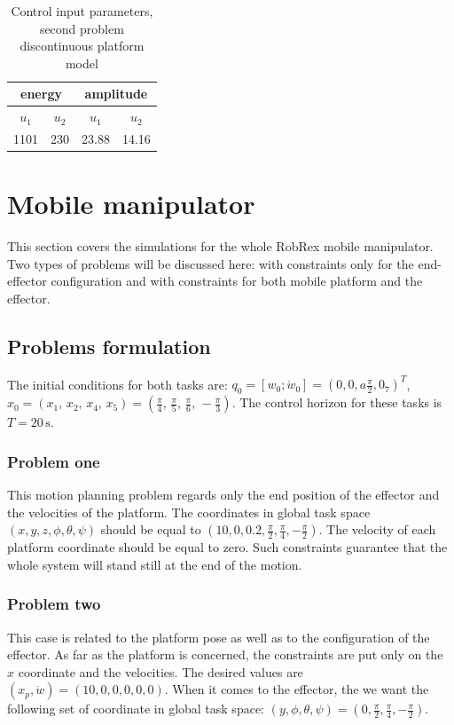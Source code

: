 \begin{table}[htb]
\caption{Control input parameters, second problem discontinuous platform model}
\label{tab:in_discont_ok}
\centering
\begin{tabular}{|l|l|l|l|}
\hline
\multicolumn{2}{|c|}{energy}                             & \multicolumn{2}{c|}{amplitude}                          \\ \hline
\multicolumn{1}{|c|}{$u_1$} & \multicolumn{1}{c|}{$u_2$} & \multicolumn{1}{c|}{$u_1$} & \multicolumn{1}{c|}{$u_2$} \\ \hline
1101                       & 230                        & 23.88                      & 14.16                      \\ \hline
\end{tabular}
\end{table}



\section{Mobile manipulator}
This section covers the simulations for the whole RobRex mobile manipulator. Two types of problems will
be discussed here: with constraints only for the end-effector configuration and with constraints for
both mobile platform and the effector.
\subsection{Problems formulation}
The initial conditions for both tasks are: $q_0 = [w_0; \dot{w}_0] = (0, 0, a\frac{\pi}{2}, 0_7)^T$, 
$x_0 = \left(
x_1 ,\, x_2 ,\, x_4 ,\, x_5
\right) = \left(
\frac{\pi}{4} ,\, \frac{\pi}{5} ,\, \frac{\pi}{6} ,\, -\frac{\pi}{3}
\right).$ The control horizon for these tasks is $T=20\,\mathrm{s}$.
\subsubsection{Problem one}
This motion planning problem regards only the end position of the effector
and the velocities of the platform. 
The coordinates in global task space $(x, y, z, \phi, \theta, \psi) $ should be equal to
$(10, 0, 0.2, \frac{\pi}{2}, \frac{\pi}{4}, -\frac{\pi}{2})$. The velocity of each platform coordinate
should be equal to zero. Such constraints guarantee that the whole system will stand still at the end
of the motion.
\subsubsection{Problem two}
This case is related to the platform pose as well as to the configuration of the effector.
As far as the platform is concerned, the constraints are put only on the $x$ coordinate and
the velocities. The desired values are $(x_p, \dot{w}) = (10, 0, 0, 0, 0, 0)$. When it comes to
the effector, the we want the following set of coordinate in global task space: $(y, \phi, \theta, \psi)
= (0, \frac{\pi}{2}, \frac{\pi}{4}, -\frac{\pi}{2})$.

